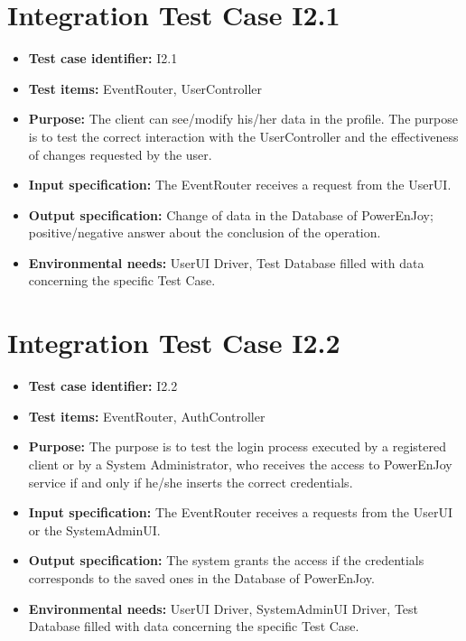 \section{Integration Test Case I2.1}
\begin{itemize}
\item \textbf{Test case identifier:} I2.1
\item \textbf{Test items:} EventRouter, UserController
\item \textbf{Purpose:} The client can see/modify his/her data in the profile. The purpose is to test the correct interaction with the UserController and the effectiveness of changes requested by the user.
\item \textbf{Input specification:} The EventRouter receives a request from the UserUI.
\item \textbf{Output specification:} Change of data in the Database of PowerEnJoy; positive/negative answer about the conclusion of the operation.
\item \textbf{Environmental needs:} UserUI Driver, Test Database filled with data concerning the specific Test Case.
\end{itemize}

\section{Integration Test Case I2.2}
\begin{itemize}
\item \textbf{Test case identifier:} I2.2
\item \textbf{Test items:} EventRouter, AuthController
\item \textbf{Purpose:} The purpose is to test the login process executed by a registered client or by a System Administrator, who receives the access to PowerEnJoy service if and only if he/she inserts the correct credentials.
\item \textbf{Input specification:} The EventRouter receives a requests from the UserUI or the SystemAdminUI.
\item \textbf{Output specification:} The system grants the access if the credentials corresponds to the saved ones in the Database of PowerEnJoy.
\item \textbf{Environmental needs:} UserUI Driver, SystemAdminUI Driver, Test Database filled with data concerning the specific Test Case.
\end{itemize}

